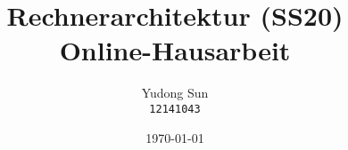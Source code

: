 \documentclass[11pt]{article}
\title{Rechnerarchitektur (SS20)\\Online-Hausarbeit \nrub}
\author{Yudong Sun\\\texttt{12141043}}
\date{\today}
\begin{document}
\maketitle

\makeatletter
    \newcommand\hanum{\two@digits{\nrub}}
\makeatother



\end{document}
